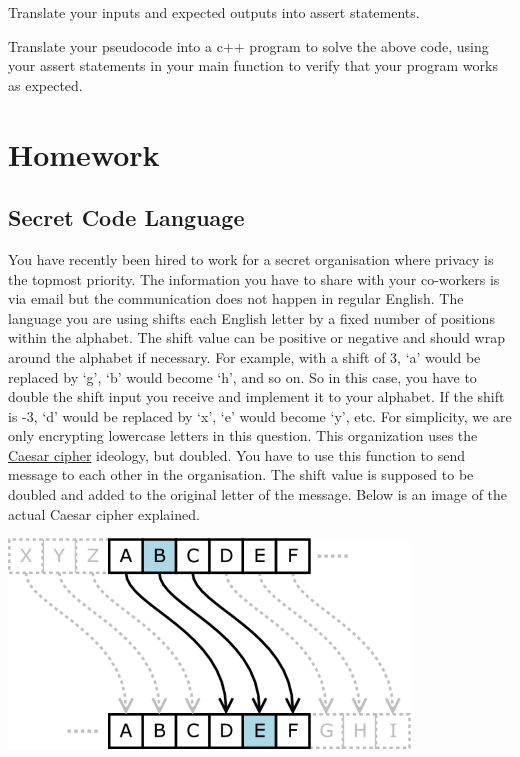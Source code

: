 \vspace{8cm}

\begin{multipart}
Translate your inputs and expected outputs into assert statements.
\end{multipart}

\vspace{8cm}

\begin{multipart}
    Translate your pseudocode into a c++ program to solve the above code, using your assert statements in your main function to verify that your program works as expected.
\end{multipart}


\vspace{8cm}


\section{Homework}

\subsection{Secret Code Language}

You have recently been hired to work for a secret organisation where privacy is the topmost priority. The information you have to share with your co-workers is via email but the communication does not happen in regular English. The language you are using shifts each English letter by a fixed number of positions within the alphabet. The shift value can be positive or negative and should wrap around the alphabet if necessary. For example, with a shift of 3, `a’ would be replaced by `g’, `b’ would become `h’, and so on. So in this case, you have to double the shift input you receive and implement it to your alphabet. If the shift is -3, `d’ would be replaced by `x’, `e’ would become `y’, etc. For simplicity, we are only encrypting lowercase letters in this question. This organization uses the \textcolor{cyan}{\href{https://en.wikipedia.org/wiki/Caesar_cipher}{Caesar cipher}} ideology, but doubled. You have to use this function to send message to each other in the organisation. The shift value is supposed to be doubled and added to the original letter of the message. Below is an image of the actual Caesar cipher explained.

\includegraphics[width=0.8\textwidth]{images/cipher.png}

